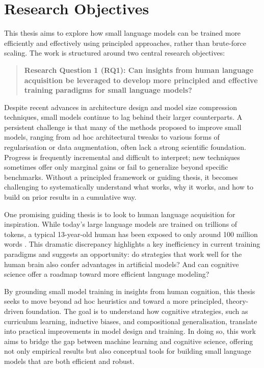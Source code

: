 
\section*{Research Objectives}

This thesis aims to explore how small language models can be trained more efficiently and effectively using principled approaches, rather than brute-force scaling. The work is structured around two central research objectives:

\begin{quote}
    \textbf{Research Question 1 (RQ1): Can insights from human language acquisition be leveraged to develop more principled and effective training paradigms for small language models?}
\end{quote}

Despite recent advances in architecture design and model size compression techniques, small models continue to lag behind their larger counterparts. A persistent challenge is that many of the methods proposed to improve small models, ranging from ad hoc architectural tweaks to various forms of regularisation or data augmentation, often lack a strong scientific foundation. Progress is frequently incremental and difficult to interpret; new techniques sometimes offer only marginal gains or fail to generalize beyond specific benchmarks. Without a principled framework or guiding thesis, it becomes challenging to systematically understand what works, why it works, and how to build on prior results in a cumulative way.

One promising guiding thesis is to look to human language acquisition for inspiration. While today's large language models are trained on trillions of tokens, a typical 13-year-old human has been exposed to only around 100 million words \citep{warstadt2023babylm1}. This dramatic discrepancy highlights a key inefficiency in current training paradigms and suggests an opportunity: do strategies that work well for the human brain also confer advantages in artificial models? And can cognitive science offer a roadmap toward more efficient language modeling?

By grounding small model training in insights from human cognition, this thesis seeks to move beyond ad hoc heuristics and toward a more principled, theory-driven foundation. The goal is to understand how cognitive strategies, such as curriculum learning, inductive biases, and compositional generalisation, translate into practical improvements in model design and training. In doing so, this work aims to bridge the gap between machine learning and cognitive science, offering not only empirical results but also conceptual tools for building small language models that are both efficient and robust.

